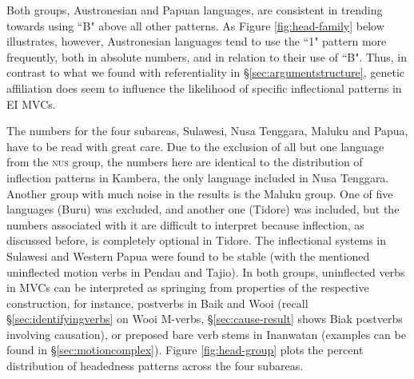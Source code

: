 Both groups, Austronesian and Papuan languages, are consistent in trending towards using ``B" above all other patterns. As Figure \ref{fig:head-family} below illustrates, however, Austronesian languages tend to use the ``1" pattern more frequently, both in absolute numbers, and in relation to their use of ``B". Thus, in contrast to what we found with referentiality in §\ref{sec:argumentstructure}, genetic affiliation does seem to influence the likelihood of specific inflectional patterns in EI MVCs. 

The numbers for the four subareas, Sulawesi, Nusa Tenggara, Maluku and Papua, have to be read with great care. Due to the exclusion of all but one language from the \textsc{nus} group, the numbers here are identical to the distribution of inflection patterns in Kambera, the only language included in Nusa Tenggara. Another group with much noise in the results is the Maluku group. One of five languages (Buru) was excluded, and another one (Tidore) was included, but the numbers associated with it are difficult to interpret because inflection, as discussed before, is completely optional in Tidore. The inflectional systems in Sulawesi and Western Papua were found to be stable (with the mentioned uninflected motion verbs in Pendau and Tajio). In both groups, uninflected verbs in MVCs can be interpreted as springing from properties of the respective construction, for instance, postverbs in Baik and Wooi (recall §\ref{sec:identifyingverbs} on Wooi M-verbs, §\ref{sec:cause-result} shows Biak postverbs involving causation), or preposed bare verb stems in Inanwatan (examples can be found in §\ref{sec:motioncomplex}). Figure \ref{fig:head-group} plots the percent distribution of headedness patterns across the four subareas.

